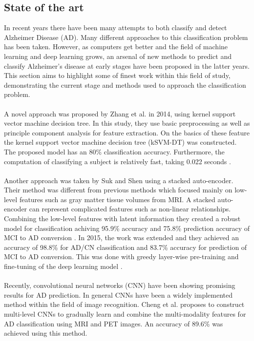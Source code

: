 \documentclass[12pt, fleqn, titlepage]{article}
\begin{document}
\subsection{State of the art}\label{statens_kunst}
In recent years there have been many attempts to both classify and detect Alzheimer Disease (AD). Many different approaches to this classification problem has been taken. However, as computers get better and the field of machine learning and deep learning grows, an arsenal of new methods to predict and classify Alzheimer's disease at early stages have been proposed in the latter years. This section aims to highlight some of finest work within this field of study, demonstrating the current stage and methods used to approach the classification problem. 
\\\\
\noindent
A novel approach was proposed by Zhang et al. in 2014, using kernel support vector machine decision tree. In this study, they use basic preprocessing as well as principle component analysis for feature extraction. On the basics of these feature the kernel support vector machine decision tree (kSVM-DT) was constructed. The proposed model has an 80\% classification accuracy. Furthermore, the computation of classifying a subject is relatively fast, taking 0.022 seconds \cite{yudong}. 
\\\\
%
Another approach was taken by Suk and Shen using a stacked auto-encoder. Their method was different from previous methods which focused mainly on low-level features such as gray matter tissue volumes from MRI. A stacked auto-encoder can represent complicated features such as non-linear relationships. Combining the low-level features with latent information they created a robust model for classification achiving 95.9\% accuracy and  75.8\% prediction accuracy of MCI to AD conversion \cite{suk_and_shen_1}. In 2015, the work was extended and they achieved an accuracy of  98.8\% for AD/CN classification and 83.7\% accuracy for prediction of MCI to AD conversion. This was done with greedy layer-wise pre-training and fine-tuning of the deep learning model \cite{suk_and_shen_2}.
\\\\
Recently, convolutional neural networks (CNN) have been showing promising results for AD prediction. In general CNNs have been a widely implemented method within the field of image recognition. Cheng et al. proposes to construct multi-level CNNs to gradually learn and combine the multi-modality features for AD classification using MRI and PET images. An accuracy of 89.6\% was achieved using this method. \cite{cheng}
\end{document}
